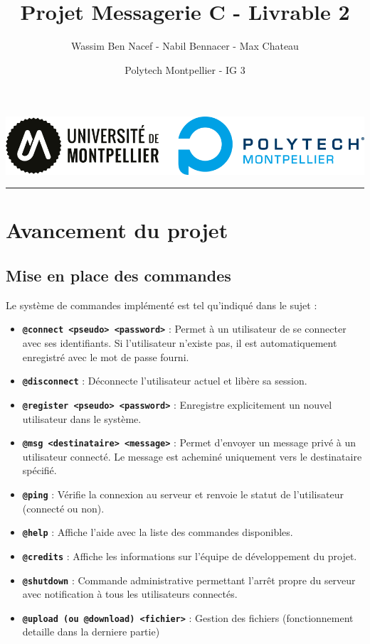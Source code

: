 \documentclass{cs-moi}
\title{Projet Messagerie C - Livrable 2}
\author{Wassim Ben Nacef - Nabil Bennacer - Max Chateau}
\date{Polytech Montpellier - IG 3}
\begin{document}
\maketitle{}
\begin{center}
	\includegraphics[width=0.3\linewidth]{logoPolytech.png}
\end{center}

\vspace{4pt}
    \hrule
\vspace{4pt}

\section{Avancement du projet}
\subsection{Mise en place des commandes}
Le système de commandes implémenté est tel qu'indiqué dans le sujet :

\begin{itemize}
    \item \texttt{\textbf{@connect <pseudo> <password>}} : Permet à un utilisateur de se connecter avec ses identifiants. Si l'utilisateur n'existe pas, il est automatiquement enregistré avec le mot de passe fourni.
    
    \item \texttt{\textbf{@disconnect}} : Déconnecte l'utilisateur actuel et libère sa session.
  
    \item \texttt{\textbf{@register <pseudo> <password>}} : Enregistre explicitement un nouvel utilisateur dans le système.
  
    \item \texttt{\textbf{@msg <destinataire> <message>}} : Permet d'envoyer un message privé à un utilisateur connecté. Le message est acheminé uniquement vers le destinataire spécifié.
  
    \item \texttt{\textbf{@ping}} : Vérifie la connexion au serveur et renvoie le statut de l'utilisateur (connecté ou non).
  
    \item \texttt{\textbf{@help}} : Affiche l'aide avec la liste des commandes disponibles.
  
    \item \texttt{\textbf{@credits}} : Affiche les informations sur l'équipe de développement du projet.
  
    \item \texttt{\textbf{@shutdown}} : Commande administrative permettant l'arrêt propre du serveur avec notification à tous les utilisateurs connectés.

    \item \texttt{\textbf{@upload (ou @download) <fichier>}} : Gestion des fichiers (fonctionnement detaille dans la derniere partie)
  \end{itemize}
  
\end{document}

